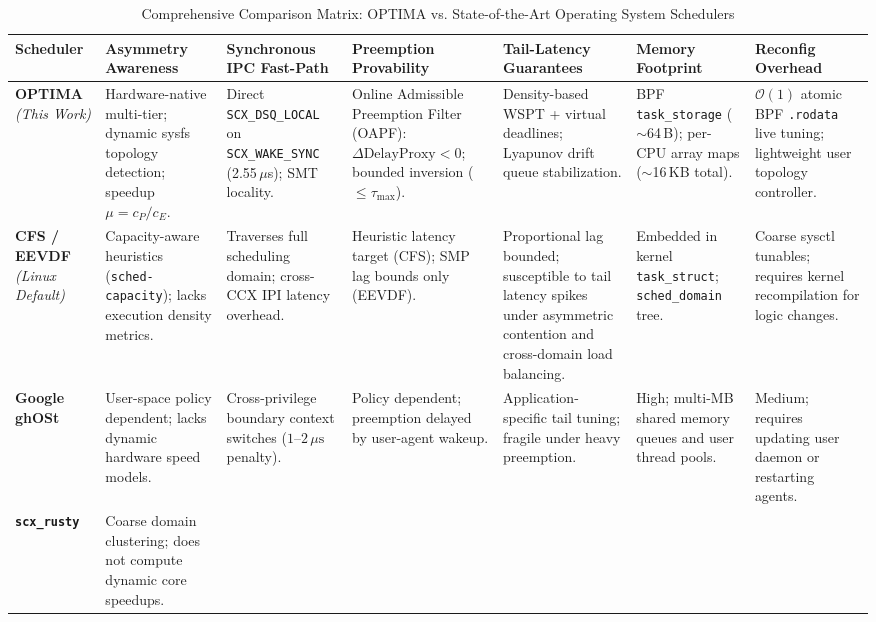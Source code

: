\documentclass[letterpaper,twocolumn,10pt]{article}
\begin{document}
\begin{table}[t]
\centering
\scriptsize
\renewcommand{\arraystretch}{0.88}
\caption{Comprehensive Comparison Matrix: OPTIMA vs. State-of-the-Art Operating System Schedulers}
\label{tab:comparison_matrix}
\begin{tabularx}{\textwidth}{l X X X X X X}
\toprule
\textbf{Scheduler} & \textbf{Asymmetry Awareness} & \textbf{Synchronous IPC Fast-Path} & \textbf{Preemption Provability} & \textbf{Tail-Latency Guarantees} & \textbf{Memory Footprint} & \textbf{Reconfig Overhead} \\
\midrule
\textbf{OPTIMA} \newline \textit{(This Work)} & 
Hardware-native multi-tier; dynamic sysfs topology detection; speedup $\mu = c_P/c_E$. & 
Direct \texttt{SCX\_DSQ\_LOCAL} on \texttt{SCX\_WAKE\_SYNC} (2.55\,$\mu$s); SMT locality. & 
Online Admissible Preemption Filter (OAPF): $\Delta\mathrm{DelayProxy} < 0$; bounded inversion ($\le \tau_{\max}$). & 
Density-based WSPT + virtual deadlines; Lyapunov drift queue stabilization. & 
BPF \texttt{task\_storage} ($\sim$64\,B); per-CPU array maps ($\sim$16\,KB total). & 
$\mathcal{O}(1)$ atomic BPF \texttt{.rodata} live tuning; lightweight user topology controller. \\
\textbf{CFS / EEVDF} \newline \textit{(Linux Default)} & 
Capacity-aware heuristics (\texttt{sched-capacity}); lacks execution density metrics. & 
Traverses full scheduling domain; cross-CCX IPI latency overhead. & 
Heuristic latency target (CFS); SMP lag bounds only (EEVDF). & 
Proportional lag bounded; susceptible to tail latency spikes under asymmetric contention and cross-domain load balancing. & 
Embedded in kernel \texttt{task\_struct}; \texttt{sched\_domain} tree. & 
Coarse sysctl tunables; requires kernel recompilation for logic changes. \\
\textbf{Google ghOSt} \newline \cite{humphries2021ghost} & 
User-space policy dependent; lacks dynamic hardware speed models. & 
Cross-privilege boundary context switches ($1\text{--}2\,\mu\text{s}$ penalty). & 
Policy dependent; preemption delayed by user-agent wakeup. & 
Application-specific tail tuning; fragile under heavy preemption. & 
High; multi-MB shared memory queues and user thread pools. & 
Medium; requires updating user daemon or restarting agents. \\
\textbf{\texttt{scx\_rusty}} \newline \cite{hodges2024schedextscale} & 
Coarse domain clustering; does not compute dynamic core speedups. & 

\end{tabularx}
\end{table}
\end{document}
